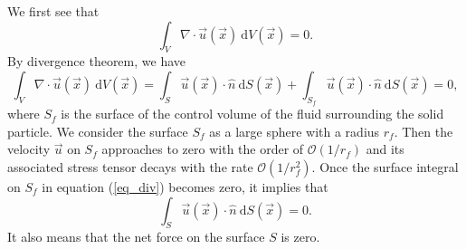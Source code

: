 We first see that
\begin{equation}
 	\int_V  \nabla \cdot \vec{u}(\vec{x}) \ \text{d}V (\vec{x}) 
		=0. 
	\label{eq_constraint_v}
\end{equation}
By divergence theorem, we have
\begin{equation}
	\int_V  \nabla \cdot \vec{u}(\vec{x}) \ \text{d}V (\vec{x})   = 
\int_{S } \vec{u}(\vec{x}) \cdot \hat{n} \ \text{d}S(\vec{x})
+ \int_{S_f} \vec{u}(\vec{x}) \cdot \hat{n} \ \text{d}S(\vec{x})=0,
\label{eq_div}
\end{equation}
where $S_f$ is the surface of the control volume of the fluid surrounding the solid particle. 
We consider the surface $S_f$ as a large sphere with a radius $r_f$. Then the velocity $\vec{u}$ on $S_f$ approaches to zero with the order of $\mathcal{O}(1/r_f)$ and its associated stress tensor decays with the rate $\mathcal{O} (1/r_f^2)$. Once the surface integral on $S_f$ in equation (\ref{eq_div}) becomes zero, it implies that
\[
\int_{S} \vec{u}(\vec{x}) \cdot \hat{n} \ \text{d}S(\vec{x}) = 0.
\]
 It also means that the net force on the surface $S$ is zero. 

